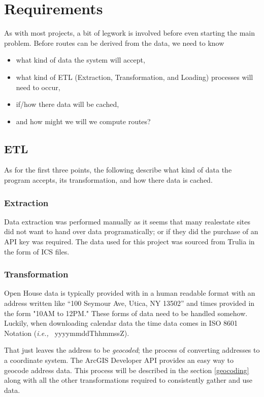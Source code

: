 \documentclass[11 pt]{article}
\theoremstyle{definition}
\theoremstyle{definition}
\def\ie{{i.e.,}\ }
\begin{document}
\section{Requirements}
As with most projects, a bit of legwork is involved before even starting the main problem. Before routes can be derived from the data, we need to know
\begin{itemize}
  \item what kind of data the system will accept,
  \item what kind of ETL (Extraction, Transformation, and Loading) processes will need to occur,
  \item if/how there data will be cached,
  \item and how might we will we compute routes?
\end{itemize}

\subsection{ETL}
As for the first three points, the following describe what kind of data the program accepts, its transformation, and how there data is cached.

\subsubsection{Extraction}
Data extraction was performed manually as it seems that many realestate sites did not want to hand over data programatically; or if they did the purchase of an API key was required. The data used for this project was sourced from Trulia\cite{Trulia} in the form of ICS files\cite{ICS}.

\subsubsection{Transformation}
Open House data is typically provided with in a human readable format with an address written like ``100 Seymour Ave, Utica, NY 13502'' and times provided in the form "10AM to 12PM." These forms of data need to be handled somehow. Luckily, when downloading calendar data the time data comes in ISO 8601 Notation (\emph{\ie} yyyymmddThhmmssZ).

That just leaves the address to be \emph{geocoded}; the process of converting addresses to a coordinate system. The ArcGIS Developer API provides an easy way to geocode address data. This process will be described in the section \ref{geocoding} along with all the other transformations required to consistently gather and use data.
 
\end{document}
